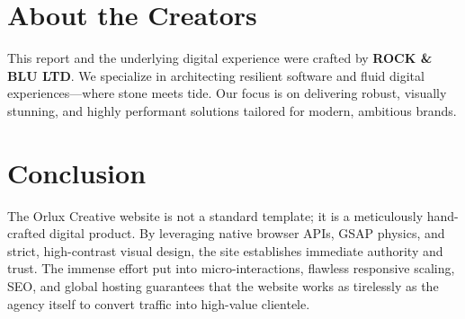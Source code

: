 \documentclass[11pt, a4paper]{article}
\begin{document}
\section{About the Creators}
This report and the underlying digital experience were crafted by \textbf{ROCK \& BLU LTD}. 
We specialize in architecting resilient software and fluid digital experiences—where stone meets tide. Our focus is on delivering robust, visually stunning, and highly performant solutions tailored for modern, ambitious brands.

\section{Conclusion}
The Orlux Creative website is not a standard template; it is a meticulously hand-crafted digital product. By leveraging native browser APIs, GSAP physics, and strict, high-contrast visual design, the site establishes immediate authority and trust. The immense effort put into micro-interactions, flawless responsive scaling, SEO, and global hosting guarantees that the website works as tirelessly as the agency itself to convert traffic into high-value clientele.
\end{document}
